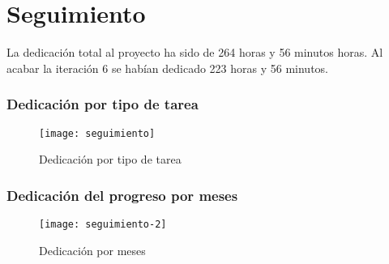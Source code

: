 
\section{Seguimiento}
\label{seguimiento}

La dedicación total al proyecto ha sido de 264 horas y 56 minutos horas. Al acabar la iteración 6 se habían dedicado 223 horas y 56 minutos.\\

\subsubsection{Dedicación por tipo de tarea}
\label{seguimiento:tipo-tarea}

\begin{figure}[!htbp]
	\centering
	\texttt{[image: seguimiento]}
	\caption{Dedicación por tipo de tarea}
	\label{fig:seguimiento}
\end{figure}

\subsubsection{Dedicación del progreso por meses}
\label{seguimiento:tiempo}

\begin{figure}[!htbp]
	\centering
	\texttt{[image: seguimiento-2]}
	\caption{Dedicación por meses}
	\label{fig:seguimiento-2}
\end{figure}